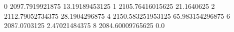 0 2097.7919921875 13.19189453125
1 2105.76416015625 21.1640625
2 2112.79052734375 28.1904296875
4 2150.583251953125 65.983154296875
6 2087.0703125 2.47021484375
8 2084.60009765625 0.0
